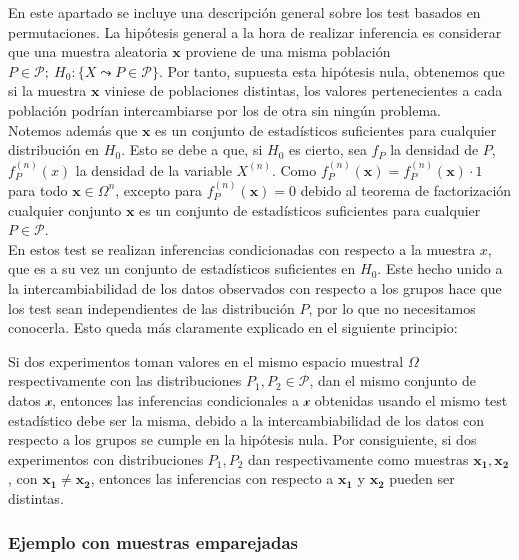 	En este apartado se incluye una descripción general sobre los test basados en permutaciones. La hipótesis general a la hora de realizar inferencia es considerar que una muestra aleatoria $\mathbf{x}$ proviene de una misma población $ P \in \mathcal{P};\ H_0: \{ X \leadsto P \in \mathcal{P} \}$. Por tanto, supuesta esta hipótesis nula, obtenemos que si la muestra $\mathbf{x}$ viniese de poblaciones distintas, los valores pertenecientes a cada población podrían intercambiarse por los de otra sin ningún problema.\\
	Notemos además que $\mathbf{x}$ es un conjunto de estadísticos suficientes para cualquier distribución en $H_0$. Esto se debe a que, si $H_0$ es cierto, sea $f_P$ la densidad de $P$, $f_P^{(n)}(x)$ la densidad de la variable $X^(n)$. Como $f_P^{(n)}(\mathbf{x}) = f_P^{(n)}(\mathbf{x}) \cdot 1$ para todo $\mathbf{x} \in \Omega^n$, excepto para $f_P^{(n)}(\mathbf{x}) = 0$ debido al teorema de factorización cualquier conjunto $\mathbf{x}$ es un conjunto de estadísticos suficientes para cualquier $P \in \mathcal{P}$.\\
	En estos test se realizan inferencias condicionadas con respecto a la muestra $x$, que es a su vez un conjunto de estadísticos suficientes en $H_0$. Este hecho unido a la intercambiabilidad de los datos observados con respecto a los grupos hace que los test sean independientes de las distribución $P$, por lo que no necesitamos conocerla. Esto queda más claramente explicado en el siguiente principio:

\begin{definicion}
	Si dos experimentos toman valores en el mismo espacio muestral $\Omega$ respectivamente con las distribuciones $P_1, P_2 \in \mathcal{P}$, dan el mismo conjunto de datos $\mathcal{x}$, entonces las inferencias condicionales a $\mathcal{x}$ obtenidas usando el mismo test estadístico debe ser la misma, debido a la intercambiabilidad de los datos con respecto a los grupos se cumple en la hipótesis nula. Por consiguiente, si dos experimentos con distribuciones $P_1, P_2$ dan respectivamente como muestras $\mathbf{x_1}, \mathbf{x_2}$, con $\mathbf{x_1} \neq \mathbf{x_2}$, entonces las inferencias con respecto a $\mathbf{x_1}$ y $\mathbf{x_2}$ pueden ser distintas.
\end{definicion}


\subsubsection{Ejemplo con muestras emparejadas}

